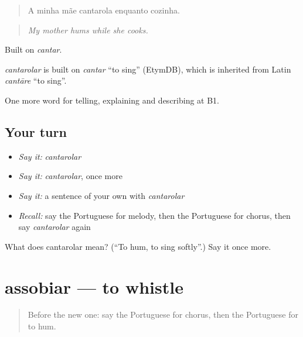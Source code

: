 \begin{quote}
A minha mãe cantarola enquanto cozinha.
\end{quote}

\begin{quote}
\emph{My mother hums while she cooks.}
\end{quote}

Built on \emph{cantar}.

\begin{cousinweb}
\emph{cantarolar} is built on \emph{cantar} \textquotedblleft{}to sing\textquotedblright{} (EtymDB), which is inherited from Latin \emph{cantāre} \textquotedblleft{}to sing\textquotedblright{}.
\end{cousinweb}

\begin{grammarlens}[title={What you've built}]
One more word for telling, explaining and describing at B1.
\end{grammarlens}

\subsection*{Your turn}
\begin{itemize}
\raggedright
  \item \emph{Say it:} \emph{cantarolar}
  \item \emph{Say it:} \emph{cantarolar}, once more
  \item \emph{Say it:} a sentence of your own with \emph{cantarolar}
  \item \emph{Recall:} say the Portuguese for melody, then the Portuguese for chorus, then say \emph{cantarolar} again
\end{itemize}

\begin{tcolorbox}[breakable,colback=teal!4,colframe=teal!35!black,title={Before you move on}]
What does cantarolar mean? (\textquotedblleft{}To hum, to sing softly\textquotedblright{}.) Say it once more.
\end{tcolorbox}
\section[assobiar]{assobiar — to whistle}

\label{lesson:PT-C518-assobiar}



\begin{quote}
Before the new one: say the Portuguese for chorus, then the Portuguese for to hum.
\end{quote}


